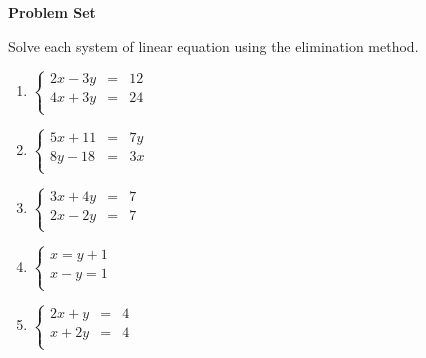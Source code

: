 \textbf{Problem Set}

\vspce

Solve each system of linear equation using the elimination method. 
\begin{enumerate}[label = \arabic*. ]
\item \hspce $
\left\{
\begin{array}{ccl}
2x-3y & = & 12 \\
4x+3y & = & 24 \\
\end{array}
\right. $
\vspce
\item \hspce $
\left\{
\begin{array}{ccl}
5x+11 & = & 7y \\
8y-18 & = & 3x \\
\end{array}
\right. $
\vspce
\item \hspce $
\left\{
\begin{array}{ccl}
3x+4y & = & 7 \\
2x-2y & = & 7 \\
\end{array}
\right. $
\vspce
\item \hspce $
\left\{
\begin{array}{l}
x  =  y+1 \\
x-y  = 1 \\
\end{array}
\right. $
\vspce
\item \hspce $
\left\{
\begin{array}{ccl}
2x+y & = & 4 \\
x+2y & = & 4 \\
\end{array}
\right. $
\end{enumerate} 